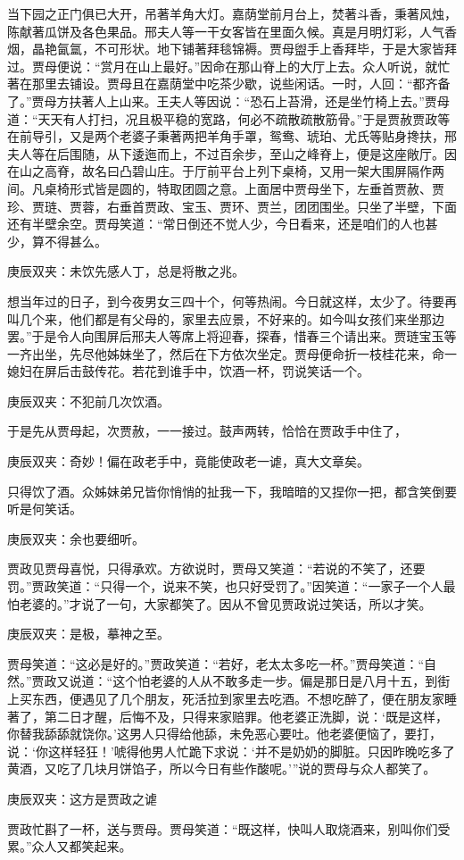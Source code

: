 \begin{parag}
    当下园之正门俱已大开，吊著羊角大灯。嘉荫堂前月台上，焚著斗香，秉著风烛，陈献著瓜饼及各色果品。邢夫人等一干女客皆在里面久候。真是月明灯彩，人气香烟，晶艳氤氲，不可形状。地下铺著拜毯锦褥。贾母盥手上香拜毕，于是大家皆拜过。贾母便说：“赏月在山上最好。”因命在那山脊上的大厅上去。众人听说，就忙著在那里去铺设。贾母且在嘉荫堂中吃茶少歇，说些闲话。一时，人回：“都齐备了。”贾母方扶著人上山来。王夫人等因说：“恐石上苔滑，还是坐竹椅上去。”贾母道：“天天有人打扫，况且极平稳的宽路，何必不疏散疏散筋骨。”于是贾赦贾政等在前导引，又是两个老婆子秉著两把羊角手罩，鸳鸯、琥珀、尤氏等贴身搀扶，邢夫人等在后围随，从下逶迤而上，不过百余步，至山之峰脊上，便是这座敞厅。因在山之高脊，故名曰凸碧山庄。于厅前平台上列下桌椅，又用一架大围屏隔作两间。凡桌椅形式皆是圆的，特取团圆之意。上面居中贾母坐下，左垂首贾赦、贾珍、贾琏、贾蓉，右垂首贾政、宝玉、贾环、贾兰，团团围坐。只坐了半壁，下面还有半壁余空。贾母笑道：“常日倒还不觉人少，今日看来，还是咱们的人也甚少，算不得甚么。\begin{note}庚辰双夹：未饮先感人丁，总是将散之兆。\end{note}想当年过的日子，到今夜男女三四十个，何等热闹。今日就这样，太少了。待要再叫几个来，他们都是有父母的，家里去应景，不好来的。如今叫女孩们来坐那边罢。”于是令人向围屏后邢夫人等席上将迎春，探春，惜春三个请出来。贾琏宝玉等一齐出坐，先尽他姊妹坐了，然后在下方依次坐定。贾母便命折一枝桂花来，命一媳妇在屏后击鼓传花。若花到谁手中，饮酒一杯，罚说笑话一个。\begin{note}庚辰双夹：不犯前几次饮酒。\end{note}于是先从贾母起，次贾赦，一一接过。鼓声两转，恰恰在贾政手中住了，\begin{note}庚辰双夹：奇妙！偏在政老手中，竟能使政老一谑，真大文章矣。\end{note}只得饮了酒。众姊妹弟兄皆你悄悄的扯我一下，我暗暗的又捏你一把，都含笑倒要听是何笑话。\begin{note}庚辰双夹：余也要细听。\end{note}贾政见贾母喜悦，只得承欢。方欲说时，贾母又笑道：“若说的不笑了，还要罚。”贾政笑道：“只得一个，说来不笑，也只好受罚了。”因笑道：“一家子一个人最怕老婆的。”才说了一句，大家都笑了。因从不曾见贾政说过笑话，所以才笑。\begin{note}庚辰双夹：是极，摹神之至。\end{note}贾母笑道：“这必是好的。”贾政笑道：“若好，老太太多吃一杯。”贾母笑道：“自然。”贾政又说道：“这个怕老婆的人从不敢多走一步。偏是那日是八月十五，到街上买东西，便遇见了几个朋友，死活拉到家里去吃酒。不想吃醉了，便在朋友家睡著了，第二日才醒，后悔不及，只得来家赔罪。他老婆正洗脚，说：‘既是这样，你替我舔舔就饶你。’这男人只得给他舔，未免恶心要吐。他老婆便恼了，要打，说：‘你这样轻狂！’唬得他男人忙跪下求说：‘并不是奶奶的脚脏。只因昨晚吃多了黄酒，又吃了几块月饼馅子，所以今日有些作酸呢。’”说的贾母与众人都笑了。\begin{note}庚辰双夹：这方是贾政之谑\end{note}贾政忙斟了一杯，送与贾母。贾母笑道：“既这样，快叫人取烧酒来，别叫你们受累。”众人又都笑起来。
\end{parag}


